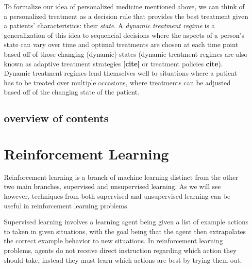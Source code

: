 \documentclass[12pt]{article}
\begin{document}

To formalize our idea of personalized medicine mentioned above, we can think of a personalized treatment as a decision rule that provides the best treatment given a patients' characteristics: their \emph{state}. A \emph{dynamic treatment regime} is a generalization of this idea to sequencial decisions where the aspects of a person's state can vary over time and optimal treatments are chosen at each time point based off of those changing (dynamic) states (dynamic treatment regimes are also known as adaptive treatment strategies \textbf{[cite]} or treatment policies \textbf{cite}). Dynamic treatment regimes lend themselves well to situations where a patient has to be treated over multiple occasions, where treatments can be adjusted based off of the changing state of the patient.



\subsection{overview of contents} %
\label{sub:overview_of_contents_of_thesis}


\section{Reinforcement Learning} %
\label{sec:reinforcement_learning}


Reinforcement learning is a branch of machine learning distinct from the other two main branches, supervised and unsupervised learning. As we will see however, techniques from both supervised and unsupervised learning can be useful in reinforcement learning problems.

Supervised learning involves a learning agent being given a list of example actions to taken in given situations, with the goal being that the agent then extrapolates the correct example behavior to new situations. In reinforcement learning problems, agents do not receive direct instruction regarding which action they should take, instead they must learn which actions are best by trying them out. 
\end{document}
